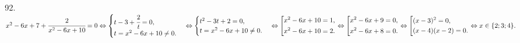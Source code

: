 92. $x^2-6x+7+\cfrac{2}{x^2-6x+10}=0\Leftrightarrow \begin{cases}t-3+\cfrac{2}{t}=0,\\ t=x^2-6x+10\neq0.\end{cases}\Leftrightarrow
\begin{cases}t^2-3t+2=0,\\ t=x^2-6x+10\neq0.\end{cases}\Leftrightarrow\left[\begin{gathered}
     x^2-6x+10=1,\hfill\\
     x^2-6x+10=2.\hfill \end{gathered}\right.\Leftrightarrow\left[\begin{gathered}
     x^2-6x+9=0,\hfill\\
     x^2-6x+8=0.\hfill \end{gathered}\right.\Leftrightarrow\left[\begin{gathered}
     (x-3)^2=0,\hfill\\
     (x-4)(x-2)=0.\hfill \end{gathered}\right.\Leftrightarrow x\in\{2;3;4\}.$\\

